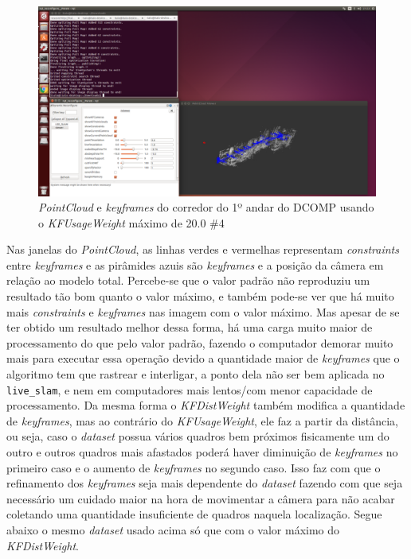 \begin{figure}[H]
	\centering
		\includegraphics[width= \textwidth]{Imagens/figura3-37.png}
	\caption{\textit{PointCloud} e \textit{keyframes} do corredor do 1º andar do DCOMP usando o \textit{KFUsageWeight} máximo de 20.0 \#4}
	\label{fig3:35}
\end{figure}


Nas janelas do \textit{PointCloud}, as linhas verdes e vermelhas representam \textit{constraints} entre \textit{keyframes} e as pirâmides azuis são \textit{keyframes} e a posição da câmera em relação ao modelo total. Percebe-se que o valor padrão não reproduziu um resultado tão bom quanto o valor máximo, e também pode-se ver que há muito mais \textit{constraints} e \textit{keyframes} nas imagem com o valor máximo. Mas apesar de se ter obtido um resultado melhor dessa forma, há uma carga muito maior de processamento do que pelo valor padrão, fazendo o computador demorar muito mais para executar essa operação devido a quantidade maior de \textit{keyframes} que o algoritmo tem que rastrear e interligar, a ponto dela não ser bem aplicada no \texttt{live\_slam}, e nem em computadores mais lentos/com menor capacidade de processamento. Da mesma forma o \textit{KFDistWeight} também modifica a quantidade de \textit{keyframes}, mas ao contrário do \textit{KFUsageWeight}, ele faz a partir da distância, ou seja, caso o \textit{dataset} possua vários quadros bem próximos fisicamente um do outro e outros quadros mais afastados poderá haver diminuição de \textit{keyframes} no primeiro caso e o aumento de \textit{keyframes} no segundo caso. Isso faz com que o refinamento dos \textit{keyframes} seja mais dependente do \textit{dataset} fazendo com que seja necessário um cuidado maior na hora de movimentar a câmera para não acabar coletando uma quantidade insuficiente de quadros naquela localização. Segue abaixo o mesmo \textit{dataset} usado acima só que com o valor máximo do \textit{KFDistWeight}.


